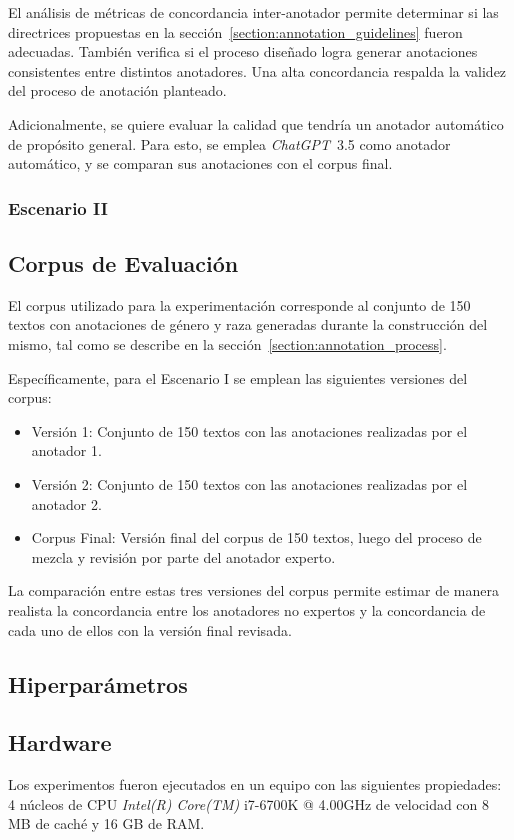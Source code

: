 El an\'alisis de m\'etricas de concordancia inter-anotador permite determinar si las directrices propuestas en la 
secci\'on~\ref{section:annotation_guidelines} fueron adecuadas. Tambi\'en verifica si el proceso dise\~nado logra generar
anotaciones consistentes entre distintos anotadores. Una alta concordancia respalda la validez del proceso de anotaci\'on
planteado.

Adicionalmente, se quiere evaluar la calidad que tendr\'ia un anotador autom\'atico de prop\'osito general. Para esto, se 
emplea \emph{ChatGPT}~3.5 como anotador autom\'atico, y se comparan sus anotaciones con el corpus final.

\subsubsection{Escenario II}
\subsection{Corpus de Evaluaci\'on}
El corpus utilizado para la experimentaci\'on corresponde al conjunto de 150 textos con anotaciones de g\'enero y raza
generadas durante la construcci\'on del mismo, tal como se describe en la secci\'on~\ref{section:annotation_process}.

Espec\'ificamente, para el Escenario I se emplean las siguientes versiones del corpus:
\begin{itemize}
    \item Versi\'on 1: Conjunto de 150 textos con las anotaciones realizadas por el anotador 1.
    \item Versi\'on 2: Conjunto de 150 textos con las anotaciones realizadas por el anotador 2.
    \item Corpus Final: Versi\'on final del corpus de 150 textos, luego del proceso de mezcla y revisi\'on por parte 
    del anotador experto.
\end{itemize}

La comparaci\'on entre estas tres versiones del corpus permite estimar de manera realista la concordancia entre los anotadores 
no expertos y la concordancia de cada uno de ellos con la versi\'on final revisada. 

\subsection{Hiperpar\'ametros}
\subsection{Hardware}
Los experimentos fueron ejecutados en un equipo con las siguientes propiedades: 4 n\'ucleos de CPU \emph{Intel(R) Core(TM)} i7-6700K
@ 4.00GHz de velocidad con 8 MB de cach\'e y 16 GB de RAM.


